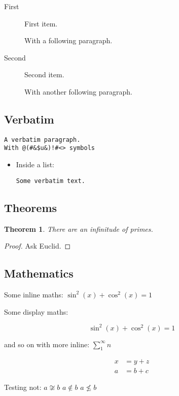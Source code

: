\documentclass[
  text,
  xhtml,
  itex
]{internet}
\newtheorem{theorem}{Theorem}
\begin{document}
\begin{description}
\item[First] First item.

With a following paragraph.

\item[Second] Second item.

With another following paragraph.
\end{description}


\subsection{Verbatim}

\begin{verbatim}
A verbatim paragraph.
With @(#&$u&)!#<> symbols
\end{verbatim}

\begin{itemize}
\item Inside a list:

\begin{verbatim}
Some verbatim text.
\end{verbatim}

\end{itemize}

\subsection{Theorems}

\begin{theorem}
There are an infinitude of primes.
\end{theorem}

\begin{proof}
Ask Euclid.
\end{proof}

\subsection{Mathematics}

Some inline maths: \(\sin^2(x) + \cos^2(x) = 1\)

Some display maths:

\[
  \sin^2(x) + \cos^2(x) = 1
\]

and so on with more inline: \(\sum_1^\infty n\)

\begin{align*}
x &= y + z \\
a &= b + c
\end{align*}

Testing not: \(a \not\cong b\) \(a \not\in b\) \(a \not\le b\)
\end{document}
